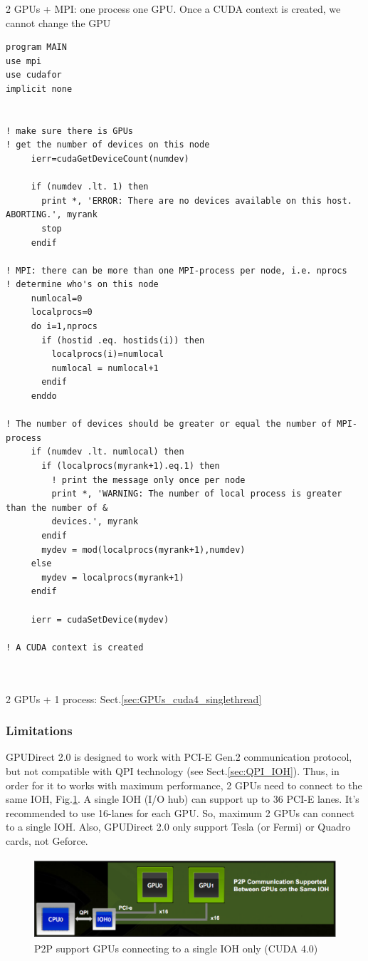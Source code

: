 2 GPUs + MPI: one process one GPU. Once a CUDA context is created, we cannot
change the GPU
\begin{verbatim}
program MAIN
use mpi
use cudafor
implicit none


! make sure there is GPUs 
! get the number of devices on this node
     ierr=cudaGetDeviceCount(numdev)

     if (numdev .lt. 1) then
       print *, 'ERROR: There are no devices available on this host.  ABORTING.', myrank
       stop
     endif

! MPI: there can be more than one MPI-process per node, i.e. nprocs
! determine who's on this node
     numlocal=0
     localprocs=0
     do i=1,nprocs
       if (hostid .eq. hostids(i)) then
         localprocs(i)=numlocal
         numlocal = numlocal+1
       endif
     enddo

! The number of devices should be greater or equal the number of MPI-process
     if (numdev .lt. numlocal) then
       if (localprocs(myrank+1).eq.1) then
         ! print the message only once per node
         print *, 'WARNING: The number of local process is greater than the number of &
         devices.', myrank
       endif
       mydev = mod(localprocs(myrank+1),numdev)
     else
       mydev = localprocs(myrank+1)
     endif

     ierr = cudaSetDevice(mydev)

! A CUDA context is created

     
\end{verbatim}

2 GPUs + 1 process: Sect.\ref{sec:GPUs_cuda4_singlethread}


\subsubsection{Limitations}

GPUDirect 2.0 is designed to work with PCI-E Gen.2 communication protocol, but
not compatible with QPI technology (see Sect.\ref{sec:QPI_IOH}).
Thus, in order for it to works with maximum performance, 2 GPUs need to connect
to the same IOH, Fig.\ref{fig:GPUDirect2.0_IOH}. A single IOH (I/O hub) can
support up to 36 PCI-E lanes. It's recommended to use 16-lanes for each GPU. So,
maximum 2 GPUs can connect to a single IOH. Also, GPUDirect 2.0 only support
Tesla (or Fermi) or Quadro cards, not Geforce.


\begin{figure}[hbt]
  \centerline{\includegraphics[height=3cm,
    angle=0]{./images/IOH_single.eps}}
\caption{P2P support GPUs connecting to a single IOH only (CUDA 4.0)}
\label{fig:GPUDirect2.0_IOH}
\end{figure}

